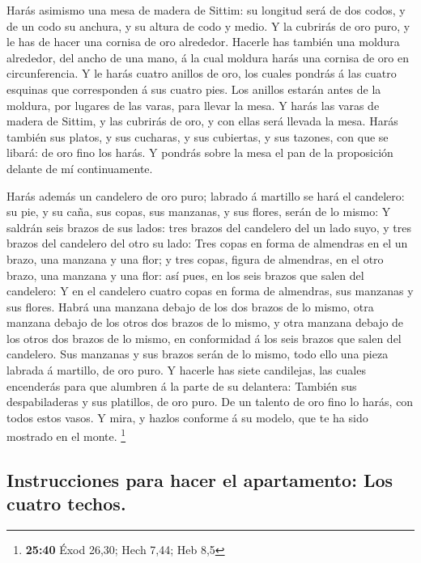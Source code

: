 Harás asimismo una mesa de madera de Sittim: su longitud
será de dos codos, y de un codo su anchura, y su altura de codo y medio.
 Y la cubrirás de oro puro, y le has de hacer una cornisa
de oro alrededor.  Hacerle has también una moldura
alrededor, del ancho de una mano, á la cual moldura harás una cornisa de
oro en circunferencia.  Y le harás cuatro anillos de oro,
los cuales pondrás á las cuatro esquinas que corresponden á sus cuatro
pies.  Los anillos estarán antes de la moldura, por lugares
de las varas, para llevar la mesa.  Y harás las varas de
madera de Sittim, y las cubrirás de oro, y con ellas será llevada la
mesa.  Harás también sus platos, y sus cucharas, y sus
cubiertas, y sus tazones, con que se libará: de oro fino los harás.
 Y pondrás sobre la mesa el pan de la proposición delante
de mí continuamente.

 Harás además un candelero de oro puro; labrado á martillo
se hará el candelero: su pie, y su caña, sus copas, sus manzanas, y sus
flores, serán de lo mismo:  Y saldrán seis brazos de sus
lados: tres brazos del candelero del un lado suyo, y tres brazos del
candelero del otro su lado:  Tres copas en forma de
almendras en el un brazo, una manzana y una flor; y tres copas, figura
de almendras, en el otro brazo, una manzana y una flor: así pues, en los
seis brazos que salen del candelero:  Y en el candelero
cuatro copas en forma de almendras, sus manzanas y sus flores.
 Habrá una manzana debajo de los dos brazos de lo mismo,
otra manzana debajo de los otros dos brazos de lo mismo, y otra manzana
debajo de los otros dos brazos de lo mismo, en conformidad á los seis
brazos que salen del candelero.  Sus manzanas y sus brazos
serán de lo mismo, todo ello una pieza labrada á martillo, de oro puro.
 Y hacerle has siete candilejas, las cuales encenderás para
que alumbren á la parte de su delantera:  También sus
despabiladeras y sus platillos, de oro puro.  De un talento
de oro fino lo harás, con todos estos vasos.  Y mira, y
hazlos conforme á su modelo, que te ha sido mostrado en el monte.
\footnote{\textbf{25:40} Éxod 26,30; Hech 7,44; Heb 8,5}

\hypertarget{instrucciones-para-hacer-el-apartamento-los-cuatro-techos.}{%
\subsection{Instrucciones para hacer el apartamento: Los cuatro
techos.}\label{instrucciones-para-hacer-el-apartamento-los-cuatro-techos.}}

